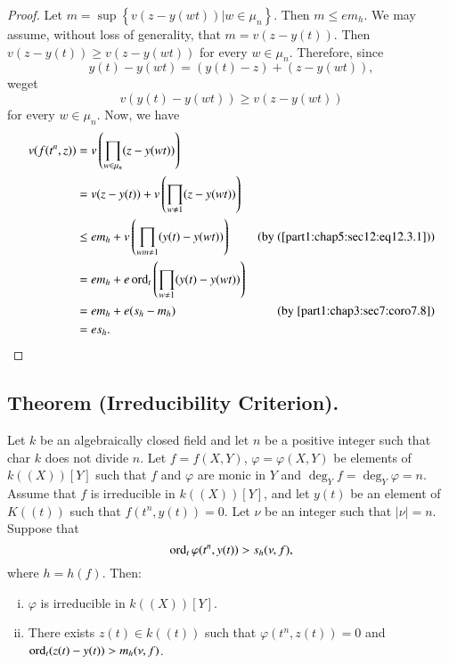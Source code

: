 \begin{proof}
Let $m=\sup \left\{ v(z-y(wt)) \Big| w \in \mu_n\right\}$. Then $m
\leq em_h$. We may assume, without loss of generality, that
$m=v(z-y(t))$. Then $v(z-y(t)) \geq v(z-y(wt))$ for every $w \in
\mu_n$. Therefore, since 
$$
y(t) - y(wt) = (y(t) - z)+ (z - y(wt)),
$$
we\pageoriginale get
\begin{equation*}
  v(y(t)- y(wt))\geq v(z- y(wt))
  \tag{12.3.1}\label{part1:chap5:sec12:eq12.3.1} 
\end{equation*}
for every $w \in \mu_n$. Now, we have
\begin{align*}
  v (f(t^n, z)) & = v\left(\prod_{w \in \mu_n}  (z-y(wt))\right)\\
  & = v(z- y(t))+ v \left( \prod_{w \neq 1} (z-y(wt))\right)\\
  & \leq em_h + v \left( \prod_{w m\neq 1} (y(t)- y (wt))\right)&
  \text{(by (\ref{part1:chap5:sec12:eq12.3.1}))}\\
  & = em_h + e \operatorname{ord}_t \left( \prod_{w \neq 1} (y (t)- y (wt))\right)\\
  & = em_h + e(s_h - m_h) & \text{(by
    \ref{part1:chap3:sec7:coro7.8})}\\
  & = e s_h.
\end{align*}
\end{proof}

\setcounter{subsection}{3}

\subsection{Theorem (Irreducibility
  Criterion).}\label{part1:chap5:sec12:ss12.4}  

Let $k$ be an algebraically  closed field and let $n$ be a positive
integer such that char $k$ does not divide $n$. Let $f= f(X, Y)$,
$\varphi= \varphi (X, Y)$ be elements of $k((X))[Y]$ such that $f$ and
$\varphi$ are monic in $Y$ and $\deg_Y f= \deg_Y \varphi=n$. Assume
that $f$ is irreducible in $k ((X)) [Y]$, and let $y(t)$ be an element
of $K((t))$ such that $f(t^n, y(t))=0$. Let $\nu$ be an integer such
that $|\nu|=n$. Suppose that
$$
\operatorname{ord}_t \varphi (t^n, y(t)) > s_h (\nu, f),
$$
where $h= h(f)$. Then:
\begin{enumerate}[(i)]
\item $\varphi$ is irreducible in $k((X)) [Y]$.
\item There exists $z(t) \in k((t))$ such that $\varphi(t^n, z (t))=0$
  and $\operatorname{ord}_t (z(t)- y(t)) > m_h (\nu, f)$.\pageoriginale
\end{enumerate}

